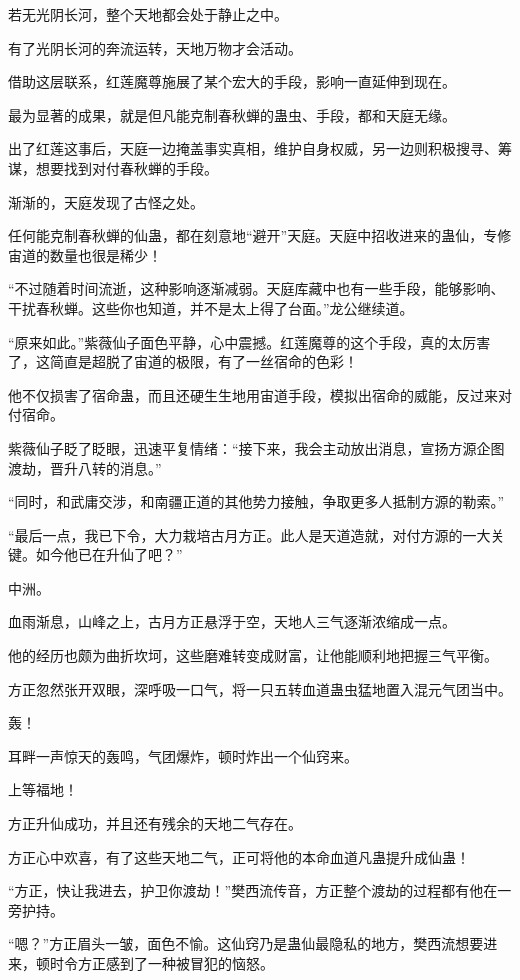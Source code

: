 \begin{this_body}
若无光阴长河，整个天地都会处于静止之中。

有了光阴长河的奔流运转，天地万物才会活动。

借助这层联系，红莲魔尊施展了某个宏大的手段，影响一直延伸到现在。

最为显著的成果，就是但凡能克制春秋蝉的蛊虫、手段，都和天庭无缘。

出了红莲这事后，天庭一边掩盖事实真相，维护自身权威，另一边则积极搜寻、筹谋，想要找到对付春秋蝉的手段。

渐渐的，天庭发现了古怪之处。

任何能克制春秋蝉的仙蛊，都在刻意地“避开”天庭。天庭中招收进来的蛊仙，专修宙道的数量也很是稀少！

“不过随着时间流逝，这种影响逐渐减弱。天庭库藏中也有一些手段，能够影响、干扰春秋蝉。这些你也知道，并不是太上得了台面。”龙公继续道。

“原来如此。”紫薇仙子面色平静，心中震撼。红莲魔尊的这个手段，真的太厉害了，这简直是超脱了宙道的极限，有了一丝宿命的色彩！

他不仅损害了宿命蛊，而且还硬生生地用宙道手段，模拟出宿命的威能，反过来对付宿命。

紫薇仙子眨了眨眼，迅速平复情绪：“接下来，我会主动放出消息，宣扬方源企图渡劫，晋升八转的消息。”

“同时，和武庸交涉，和南疆正道的其他势力接触，争取更多人抵制方源的勒索。”

“最后一点，我已下令，大力栽培古月方正。此人是天道造就，对付方源的一大关键。如今他已在升仙了吧？”

中洲。

血雨渐息，山峰之上，古月方正悬浮于空，天地人三气逐渐浓缩成一点。

他的经历也颇为曲折坎坷，这些磨难转变成财富，让他能顺利地把握三气平衡。

方正忽然张开双眼，深呼吸一口气，将一只五转血道蛊虫猛地置入混元气团当中。

轰！

耳畔一声惊天的轰鸣，气团爆炸，顿时炸出一个仙窍来。

上等福地！

方正升仙成功，并且还有残余的天地二气存在。

方正心中欢喜，有了这些天地二气，正可将他的本命血道凡蛊提升成仙蛊！

“方正，快让我进去，护卫你渡劫！”樊西流传音，方正整个渡劫的过程都有他在一旁护持。

“嗯？”方正眉头一皱，面色不愉。这仙窍乃是蛊仙最隐私的地方，樊西流想要进来，顿时令方正感到了一种被冒犯的恼怒。


\end{this_body}
